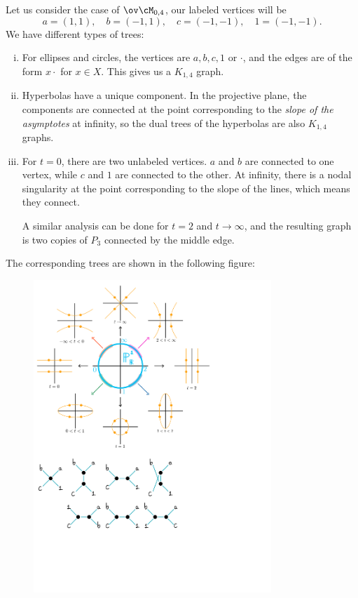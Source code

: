 \documentclass[12pt]{memoir}
\begin{document}
\begin{Ex}
Let us consider the case of $\ov\cM_{0,4}$, our labeled vertices will be 
$$a=(1,1),\quad b=(-1,1),\quad c=(-1,-1),\quad 1=(-1,-1).$$
We have different types of trees:
\begin{enumerate}[i)]
    \item For ellipses and circles, the vertices are ${a,b,c,1}$ or ${\cdot}$, and the edges are of the form $x\cdot$ for $x\in X$. This gives us a $K_{1,4}$ graph.
    \item Hyperbolas have a unique component. In the projective plane, the components are connected at the point corresponding to the \emph{slope of the asymptotes} at infinity, so the dual trees of the hyperbolas are also $K_{1,4}$ graphs.
    \item For $t=0$, there are two unlabeled vertices. $a$ and $b$ are connected to one vertex, while $c$ and $1$ are connected to the other. At infinity, there is a nodal singularity at the point corresponding to the slope of the lines, which means they connect.\par 
    A similar analysis can be done for $t=2$ and $t\to\infty$, and the resulting graph is two copies of $P_3$ connected by the middle edge.
\end{enumerate}
The corresponding trees are shown in the following figure: 
\begin{figure}[h!]
    \centering
    \includegraphics[width=0.8\textwidth, trim= 0.4cm 8.3cm 9cm 16cm,clip]{fig2.pdf}
\end{figure}
\end{Ex}
\end{document}

